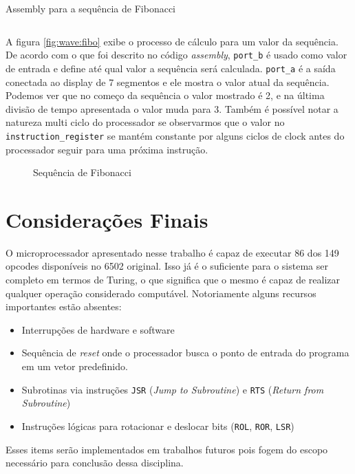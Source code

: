 \documentclass[
	12pt,				  %
	openright,		%
	a4paper,			%
	english,			%
	french,				%
	spanish,			%
	brazil,				%
]{abntex2}
\newenvironment{longlisting}{\captionsetup{type=listing}}{}
\newcommand{\code}[1]{\colorbox{light-gray}{\texttt{#1}}}
\begin{document}
\begin{longlisting}
	\caption{Assembly para a sequência de Fibonacci}
	\inputminted[breaklines]{nasm}{../quartus/snippets/fibo.s}
	\label{code:fibo}
\end{longlisting}

A figura \autoref{fig:wave:fibo} exibe o processo de cálculo para um valor da sequência.
De acordo com o que foi descrito no código \emph{assembly}, \code{port{\_}b} é usado
como valor de entrada e define até qual valor a sequência será calculada. \code{port{\_}a}
é a saída conectada ao display de 7 segmentos e ele mostra o valor atual da sequência.
Podemos ver que no começo da sequência o valor mostrado é 2, e na última divisão de tempo apresentada
o valor muda para 3. Também é possível notar a natureza multi ciclo do processador se observarmos
que o valor no \code{instruction{\_}register} se mantém constante por alguns ciclos de clock antes do processador
seguir para uma próxima instrução.

\begin{figure}[h]
	\centering
	\caption{Sequência de Fibonacci} \label{fig:wave:fibo}
	
\end{figure}

\chapter{Considerações Finais}

O microprocessador apresentado nesse trabalho é capaz de executar 86 dos 149 opcodes
disponíveis no 6502 original. Isso já é o suficiente para o sistema ser completo em
termos de Turing, o que significa que o mesmo é capaz de realizar qualquer operação
considerado computável.
Notoriamente alguns recursos importantes estão absentes:
\begin{itemize}
	\item Interrupções de hardware e software
	\item Sequência de \emph{reset} onde o processador busca o ponto de entrada do
	      programa em um vetor predefinido.
	\item Subrotinas via instruções \code{JSR} (\emph{Jump to Subroutine}) e
	      \code{RTS} (\emph{Return from Subroutine})
	\item Instruções lógicas para rotacionar e deslocar bits (\code{ROL}, \code{ROR}, \code{LSR})
\end{itemize}
Esses items serão implementados em trabalhos futuros pois fogem do escopo necessário
para conclusão dessa disciplina.
\end{document}
